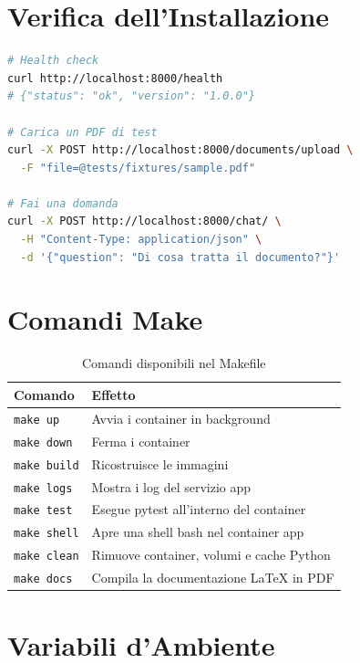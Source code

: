 \section{Verifica dell'Installazione}

\begin{lstlisting}[language=bash]
# Health check
curl http://localhost:8000/health
# {"status": "ok", "version": "1.0.0"}

# Carica un PDF di test
curl -X POST http://localhost:8000/documents/upload \
  -F "file=@tests/fixtures/sample.pdf"

# Fai una domanda
curl -X POST http://localhost:8000/chat/ \
  -H "Content-Type: application/json" \
  -d '{"question": "Di cosa tratta il documento?"}'
\end{lstlisting}

\section{Comandi Make}

\begin{table}[H]
  \centering
  \begin{tabularx}{\textwidth}{lX}
    \toprule
    \textbf{Comando} & \textbf{Effetto} \\
    \midrule
    \texttt{make up}      & Avvia i container in background \\
    \texttt{make down}    & Ferma i container \\
    \texttt{make build}   & Ricostruisce le immagini \\
    \texttt{make logs}    & Mostra i log del servizio app \\
    \texttt{make test}    & Esegue pytest all'interno del container \\
    \texttt{make shell}   & Apre una shell bash nel container app \\
    \texttt{make clean}   & Rimuove container, volumi e cache Python \\
    \texttt{make docs}    & Compila la documentazione LaTeX in PDF \\
    \bottomrule
  \end{tabularx}
  \caption{Comandi disponibili nel Makefile}
\end{table}

\section{Variabili d'Ambiente}

